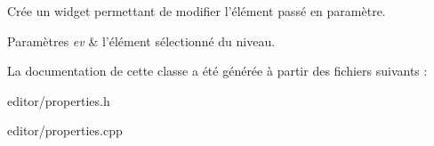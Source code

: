 Crée un widget permettant de modifier l’élément passé en paramètre. 


\begin{DoxyParams}{Paramètres}
{\em ev} & l’élément sélectionné du niveau. \\
\hline
\end{DoxyParams}


La documentation de cette classe a été générée à partir des fichiers suivants \+:\begin{DoxyCompactItemize}
\item 
editor/properties.\+h\item 
editor/properties.\+cpp\end{DoxyCompactItemize}
